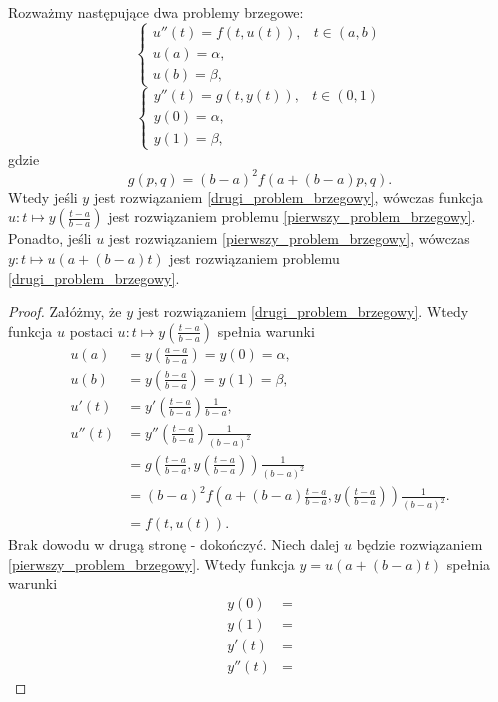 \begin{theorem}
Rozważmy następujące dwa problemy brzegowe:
\begin{equation}\label{pierwszy_problem_brzegowy}
\left\{\begin{array}{ll}
u''(t)=f(t,u(t)), & t \in (a,b) \\
u(a)=\alpha, & \\
u(b)=\beta,
\end{array}\right.
\end{equation}
\begin{equation}\label{drugi_problem_brzegowy}
\left\{\begin{array}{ll}
y''(t)=g(t,y(t)), &  t \in (0,1)\\
y(0)= \alpha, & \\
y(1)= \beta,
\end{array}\right.
\end{equation}
gdzie 
$$
g(p,q) = (b-a)^2f(a+(b-a)p,q).
$$
Wtedy jeśli $y$ jest rozwiązaniem \eqref{drugi_problem_brzegowy}, wówczas funkcja $u: t \mapsto y\left(\frac{t-a}{b-a}\right)$ jest rozwiązaniem problemu \eqref{pierwszy_problem_brzegowy}. Ponadto, jeśli $u$ jest rozwiązaniem \eqref{pierwszy_problem_brzegowy}, wówczas $y: t \mapsto u(a+(b-a)t)$ jest rozwiązaniem problemu \eqref{drugi_problem_brzegowy}.
\end{theorem}
\begin{proof}
Załóżmy, że $y$ jest rozwiązaniem \eqref{drugi_problem_brzegowy}. Wtedy funkcja $u$ postaci $u: t \mapsto y\left(\frac{t-a}{b-a}\right)$ spełnia warunki
\begin{align*}
u(a) &= y\left(\frac{a-a}{b-a}\right)= y(0) = \alpha, \\
u(b) &= y\left(\frac{b-a}{b-a}\right)= y(1) = \beta, \\
u'(t) &= y'\left(\frac{t-a}{b-a}\right)\frac{1}{b-a}, \\
u''(t) &= y''\left(\frac{t-a}{b-a}\right)\frac{1}{(b-a)^2} \\
&= g\left(\frac{t-a}{b-a},y\left(\frac{t-a}{b-a}\right)\right) \frac{1}{(b-a)^2}\\
&= (b-a)^2f\left(a+(b-a)\frac{t-a}{b-a},y\left(\frac{t-a}{b-a}\right)\right)\frac{1}{(b-a)^2}. \\
&= f(t,u(t)).
\end{align*}
{\color{red} Brak dowodu w drugą stronę - dokończyć.}
Niech dalej $u$ będzie rozwiązaniem \eqref{pierwszy_problem_brzegowy}. Wtedy funkcja $y = u(a+(b-a)t)$ spełnia warunki
\begin{align*}
y(0) &= \\
y(1) &= \\
y'(t) &= \\
y''(t) &= 
\end{align*}
\end{proof}

